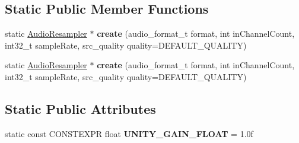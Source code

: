 \subsection*{Static Public Member Functions}
\begin{DoxyCompactItemize}
\item 
\mbox{\label{classcocos2d_1_1experimental_1_1AudioResampler_a8a09f1161cbf8f07fe5c19af701c4056}} 
static \hyperlink{classcocos2d_1_1experimental_1_1AudioResampler}{Audio\+Resampler} $\ast$ {\bfseries create} (audio\+\_\+format\+\_\+t format, int in\+Channel\+Count, int32\+\_\+t sample\+Rate, src\+\_\+quality quality=D\+E\+F\+A\+U\+L\+T\+\_\+\+Q\+U\+A\+L\+I\+TY)
\item 
\mbox{\label{classcocos2d_1_1experimental_1_1AudioResampler_a952838e143a65f717043d6a9186f6823}} 
static \hyperlink{classcocos2d_1_1experimental_1_1AudioResampler}{Audio\+Resampler} $\ast$ {\bfseries create} (audio\+\_\+format\+\_\+t format, int in\+Channel\+Count, int32\+\_\+t sample\+Rate, src\+\_\+quality quality=D\+E\+F\+A\+U\+L\+T\+\_\+\+Q\+U\+A\+L\+I\+TY)
\end{DoxyCompactItemize}
\subsection*{Static Public Attributes}
\begin{DoxyCompactItemize}
\item 
\mbox{\label{classcocos2d_1_1experimental_1_1AudioResampler_a2ad8cf2eb8af1d5ceb064efe5161228d}} 
static const C\+O\+N\+S\+T\+E\+X\+PR float {\bfseries U\+N\+I\+T\+Y\+\_\+\+G\+A\+I\+N\+\_\+\+F\+L\+O\+AT} = 1.\+0f
\end{DoxyCompactItemize}
